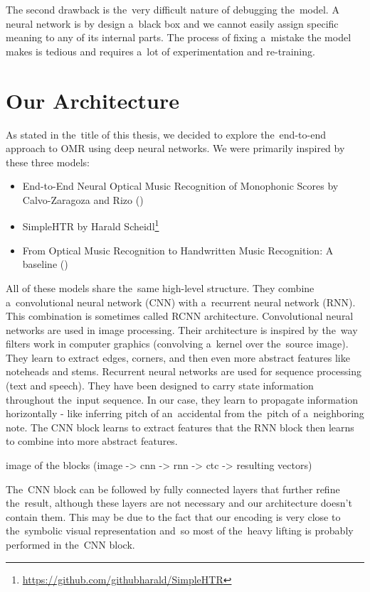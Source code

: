 The second drawback is the~very difficult nature of debugging the~model. A neural network is by design a~black box and we cannot easily assign specific meaning to any of its internal parts. The process of fixing a~mistake the model makes is tedious and requires a~lot of experimentation and re-training.


\section{Our Architecture}

As stated in the~title of this thesis, we decided to explore the~end-to-end approach to OMR using deep neural networks. We were primarily inspired by these three models:

\begin{itemize}
\item End-to-End Neural Optical Music Recognition of Monophonic Scores by Calvo-Zaragoza and Rizo (\cite{Primus})
\item SimpleHTR by Harald Scheidl\footnote{\href{https://github.com/githubharald/SimpleHTR}{https://github.com/githubharald/SimpleHTR}}
\item From Optical Music Recognition to Handwritten Music Recognition: A baseline (\cite{HmrBaseline})
\end{itemize}

All of these models share the~same high-level structure. They combine a~convolutional neural network (CNN) with a~recurrent neural network (RNN). This combination is sometimes called RCNN architecture. Convolutional neural networks are used in image processing. Their architecture is inspired by the~way filters work in computer graphics (convolving a~kernel over the~source image). They learn to extract edges, corners, and then even more abstract features like noteheads and stems. Recurrent neural networks are used for sequence processing (text and speech). They have been designed to carry state information throughout the~input sequence. In our case, they learn to propagate information horizontally - like inferring pitch of an~accidental from the~pitch of a~neighboring note. The CNN block learns to extract features that the RNN block then learns to combine into more abstract features.

\begin{code}
image of the blocks
(image -> cnn -> rnn -> ctc -> resulting vectors)
\end{code}

The~CNN block can be followed by fully connected layers that further refine the~result, although these layers are not necessary and our architecture doesn't contain them. This may be due to the fact that our encoding is very close to the~symbolic visual representation and~so most of the~heavy lifting is probably performed in the~CNN block.


